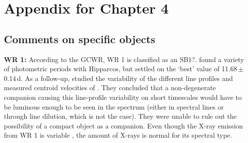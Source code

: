\chapter{Appendix for Chapter 4}

\section{Comments on specific objects}\label{apdx:comments_WNE}

\textbf{WR 1:}
According to the GCWR, WR 1 is classified as an SB1?. \citet{1998MarchenkoMoffatPhotometry} found a variety of photometric periods with Hipparcos, but settled on the `best' value of 11.68\,$\pm$\,0.14\,d. As a follow-up, \citet{1999aMorel} studied the variability of the different line profiles and measured centroid velocities of \HeII{}. They concluded that a non-degenerate companion causing this line-profile variability on short timescales would have to be luminous enough to be seen in the spectrum (either in spectral lines or through line dilution, which is not the case). They were unable to rule out the possibility of a compact object as a companion. Even though the X-ray emission from WR 1 is variable \citep[]{1996Wessolowski}, the amount of X-rays is normal for its spectral type. 

